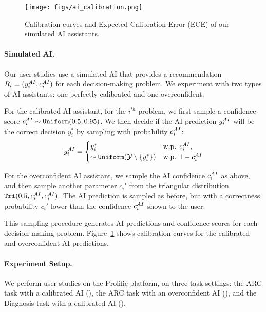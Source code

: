 \begin{figure}[t]
    \centering
    \texttt{[image: figs/ai\_calibration.png]}
    \caption{Calibration curves and Expected Calibration Error (ECE) of our simulated AI assistants.}
    \label{fig:ai_calibration}
\end{figure}


\paragraph{Simulated AI.} Our user studies use a simulated AI that provides a recommendation $R_i = (y^{AI}_i, c^{AI}_i)$ for each decision-making problem. 
We experiment with two types of AI assistants: one perfectly calibrated and one overconfident. 

For the calibrated AI assistant, for the $i^{th}$ problem, we first sample a confidence score $c^{AI}_i \sim \texttt{Uniform}(0.5, 0.95)$. 
We then decide if the AI prediction $y^{AI}_i$ will be the correct decision $y^*_i$ by sampling with probability $c^{AI}_i$:
\vspace{-0.5em}
    \[ y^{AI}_i =  
        \begin{cases}
        y^*_i & \text{w.p. } c^{AI}_i, \\
        \sim \texttt{Uniform}(\mathcal{Y} \setminus \{y^*_i\}) & \text{w.p. } 1-c^{AI}_i
        \end{cases}
    \]

For the overconfident AI assistant, we sample the AI confidence $c^{AI}_i$ as above, and then sample another parameter $c_i'$ from the triangular distribution $\texttt{Tri}(0.5, c^{AI}_i, c^{AI}_i)$. 
The AI prediction is sampled as before, but with a correctness probability $c_i'$ lower than the confidence $c^{AI}_i$ shown to the user.

This sampling procedure generates AI predictions and confidence scores for each decision-making problem. 
Figure~\ref{fig:ai_calibration} shows calibration curves for the calibrated and overconfident AI predictions.


\paragraph{Experiment Setup.} 

We perform user studies on the Prolific platform, on three task settings: the ARC task with a calibrated AI (\arcc), the ARC task with an overconfident AI (\arco), and the Diagnosis task with a calibrated AI (\diagc). 

